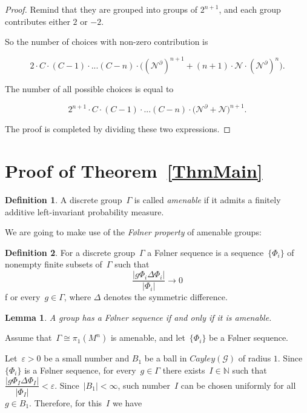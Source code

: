 \documentclass[12pt]{amsart}
\theoremstyle{plain}
\newtheorem{lemma}[theorem]{Lemma}
\theoremstyle{definition}
\newtheorem{definition}{Definition}
\theoremstyle{plain}
\theoremstyle{definition}
\begin{document}
\begin{proof}
 Remind that they are grouped into groups of $2^{n+1}$, and each group contributes either $2$ or $-2$.
 
  {So the number of choices with non-zero contribution is }
 
   {$$2\cdot C\cdot(C-1)\cdot ...(C-n)\cdot\Big((\mathcal{N}^\partial)^{n+1} +(n+1)\cdot \mathcal{N} \cdot (\mathcal{N}^\partial)^{n}\Big). $$}
 
 The number of all possible choices is  equal to
 
 $$2^{n+1}\cdot C\cdot(C-1)\cdot ...(C-n)\cdot\Big(\mathcal{N}^\partial + \mathcal{N}\Big)^{n+1} . $$
 
 
 {The proof is completed by dividing these two expressions.}
  
  
  \end{proof}
  
  \section{Proof of Theorem~\ref{ThmMain}}\label{sec:proof}
 

\begin{definition}
    A discrete group~$\Gamma$ is called \textit{amenable} if it admits a finitely additive left-invariant probability measure.
\end{definition}

We are going to make use of the \textit{F{\o}lner property} of amenable groups:

\begin{definition}
For a discrete group~$\Gamma$ a F{\o}lner sequence is a sequence~$\{\Phi_i\}$ of nonempty finite subsets of~$\Gamma$ such that
$$\dfrac{|g\Phi_i\Delta \Phi_i|}{|\Phi_i|}\rightarrow 0$$ f
or every~$g\in \Gamma$, where $\Delta$ denotes the symmetric difference.
\end{definition}



\begin{lemma} \cite{Folner}
    A group has a F{\o}lner sequence if and only if it is amenable.
\end{lemma}

Assume that~$\Gamma \cong \pi_1(M^n)$ is amenable, and let~$\{\Phi_i\}$ be a F{\o}lner sequence. 



Let~$\varepsilon >0$ be a small number and $B_1$ be a ball in $Cayley(\mathcal{G})$ of radius $1$.
Since~$\{\Phi_i\}$ is a F{\o}lner sequence,  for every~$g\in \Gamma$ there exists~$I \in \mathbb{N}$ such that~$\dfrac{|g\Phi_I\Delta \Phi_I|}{|\Phi_I|}<\varepsilon$. Since~$|B_1|<\infty$,  such number~$I$ can be chosen uniformly for all~$g\in B_1$. Therefore, for this~$I$ we have
\end{document}
